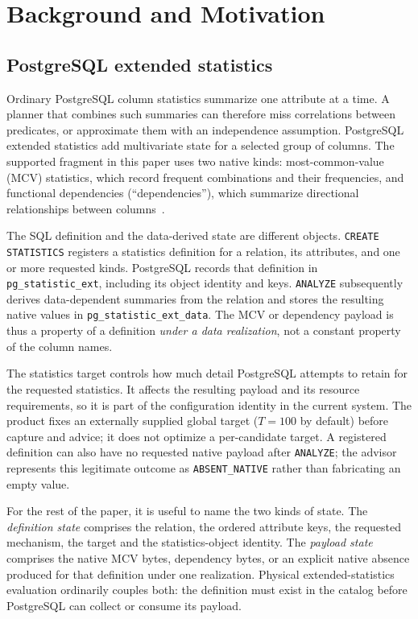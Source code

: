 \section{Background and Motivation}

\subsection{PostgreSQL extended statistics}

Ordinary PostgreSQL column statistics summarize one attribute at a time.  A
planner that combines such summaries can therefore miss correlations between
predicates, or approximate them with an independence assumption.  PostgreSQL
extended statistics add multivariate state for a selected group of columns.
The supported fragment in this paper uses two native kinds: most-common-value
(MCV) statistics, which record frequent combinations and their frequencies,
and functional dependencies (``dependencies''), which summarize directional
relationships between columns~\cite{postgresql16docs,postgresql16source}.

The SQL definition and the data-derived state are different objects.
\texttt{CREATE STATISTICS} registers a statistics definition for a relation,
its attributes, and one or more requested kinds.  PostgreSQL records that
definition in \texttt{pg\_statistic\_ext}, including its object identity and
keys.  \texttt{ANALYZE} subsequently derives data-dependent summaries from
the relation and stores the resulting native values in
\texttt{pg\_statistic\_ext\_data}.  The MCV or dependency payload is thus a
property of a definition \emph{under a data realization}, not a constant
property of the column names.

The statistics target controls how much detail PostgreSQL attempts to retain
for the requested statistics.  It affects the resulting payload and its
resource requirements, so it is part of the configuration identity in the
current system.  The product fixes an externally supplied global target
($T=100$ by default) before capture and advice; it does not optimize a
per-candidate target.  A registered definition can also have no requested
native payload after \texttt{ANALYZE}; the advisor represents this legitimate
outcome as \texttt{ABSENT\_NATIVE} rather than fabricating an empty value.

For the rest of the paper, it is useful to name the two kinds of state.  The
\emph{definition state} comprises the relation, the ordered attribute keys,
the requested mechanism, the target and the statistics-object identity.  The
\emph{payload state} comprises the native MCV bytes, dependency bytes, or an
explicit native absence produced for that definition under one realization.
Physical extended-statistics evaluation ordinarily couples both: the
definition must exist in the catalog before PostgreSQL can collect or consume
its payload.


